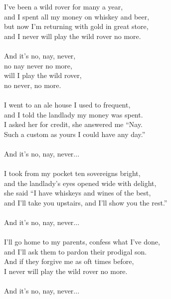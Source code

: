 
            I’ve been a wild rover for many a year, \\
            and I spent all my money on whiskey and beer, \\
            but now I’m returning with gold in great store, \\
            and I never will play the wild rover no more. \\
\hspace{10mm} \\
            And it’s no, nay, never, \\
            no nay never no more, \\
            will I play the wild rover, \\
            no never, no more. \\
\hspace{10mm} \\
            I went to an ale house I used to frequent, \\
            and I told the landlady my money was spent. \\
            I asked her for credit, she answered me “Nay. \\
            Such a custom as yours I could have any day.” \\
\hspace{10mm} \\
            And it’s no, nay, never... \\
\hspace{10mm} \\
            I took from my pocket ten sovereigns bright, \\
            and the landlady’s eyes opened wide with delight, \\
            she said “I have whiskeys and wines of the best, \\
            and I'll take you upstairs, and I'll show you the rest.” \\
\hspace{10mm} \\
            And it’s no, nay, never... \\
\hspace{10mm} \\
            I’ll go home to my parents, confess what I’ve done, \\
            and I’ll ask them to pardon their prodigal son. \\
            And if they forgive me as oft times before, \\
            I never will play the wild rover no more. \\
\hspace{10mm} \\
            And it’s no, nay, never... \\

